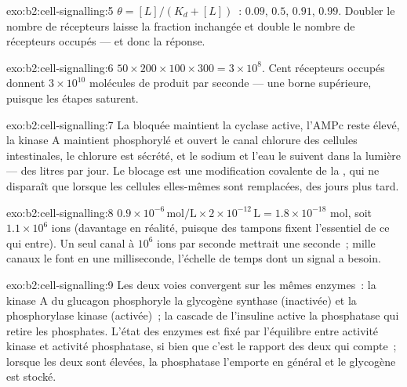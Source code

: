 \begin{solution}{exo:b2:cell-signalling:5}
$\theta = [L]/(K_d + [L])$~: $0.09$, $0.5$, $0.91$, $0.99$. Doubler le
nombre de récepteurs laisse la fraction inchangée et double le nombre de
récepteurs occupés --- et donc la réponse.
\end{solution}

\begin{solution}{exo:b2:cell-signalling:6}
$50\times 200\times 100\times 300 = 3\times 10^{8}$. Cent récepteurs
occupés donnent $3\times 10^{10}$ molécules de produit par seconde ---
une borne supérieure, puisque les étapes saturent.
\end{solution}

\begin{solution}{exo:b2:cell-signalling:7}
La  bloquée maintient la cyclase active, l'AMPc reste élevé,
la kinase A maintient phosphorylé et ouvert le canal chlorure des
cellules intestinales, le chlorure est sécrété, et le sodium et l'eau le
suivent dans la lumière --- des litres par jour. Le blocage est une
modification covalente de la , qui ne disparaît que lorsque
les cellules elles-mêmes sont remplacées, des jours plus tard.
\end{solution}

\begin{solution}{exo:b2:cell-signalling:8}
$0.9\times 10^{-6}\,\text{mol/L}\times 2\times 10^{-12}\,\text{L} =
1.8\times 10^{-18}$ mol, soit $1.1\times 10^{6}$ ions (davantage en
réalité, puisque des tampons fixent l'essentiel de ce qui entre). Un
seul canal à $10^{6}$ ions par seconde mettrait une seconde~; mille
canaux le font en une milliseconde, l'échelle de temps dont un signal a
besoin.
\end{solution}

\begin{solution}{exo:b2:cell-signalling:9}
Les deux voies convergent sur les mêmes enzymes~: la kinase A du glucagon
phosphoryle la glycogène synthase (inactivée) et la phosphorylase kinase
(activée)~; la cascade de l'insuline active la phosphatase qui retire les
phosphates. L'état des enzymes est fixé par l'équilibre entre activité
kinase et activité phosphatase, si bien que c'est le rapport des deux
 qui compte~; lorsque les deux sont élevées, la phosphatase
l'emporte en général et le glycogène est stocké.
\end{solution}


